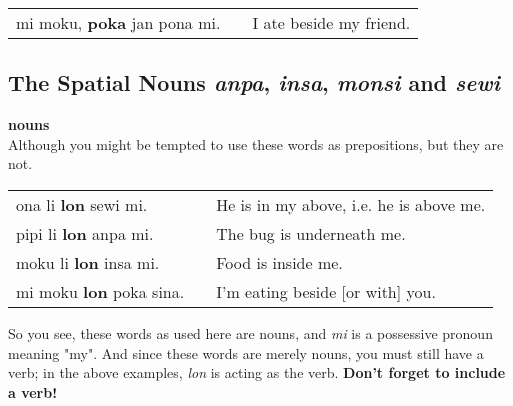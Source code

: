 \begin{supertabular}{p{5,5cm}|ll}
mi moku, \textbf{poka} jan pona mi. && I ate beside my friend. \\
\end{supertabular} 
%   
%
%
%
%
\newpage
{}
\subsection*{The Spatial Nouns \textit{anpa}, \textit{insa}, \textit{monsi} and \textit{sewi}}
%
\textbf{nouns} \\
Although you might be tempted to use these words as prepositions, but they are not. 

\begin{supertabular}{p{5,5cm}|ll}
ona li \textbf{lon} sewi mi.    &&  He is in my above, i.e. he is above me. \\
pipi li \textbf{lon} anpa mi.   &&  The bug is underneath me. \\
moku li \textbf{lon} insa mi.   &&  Food is inside me. \\
mi moku \textbf{lon} poka sina. &&  I'm eating beside [or with] you. \\
\end{supertabular} 

So you see, these words as used here are nouns, and \textit{mi} is a possessive pronoun meaning "my". 
And since these words are merely nouns, you must still have a verb; in the above examples, \textit{lon} is acting as the verb. 
\textbf{Don't forget to include a verb!} 

